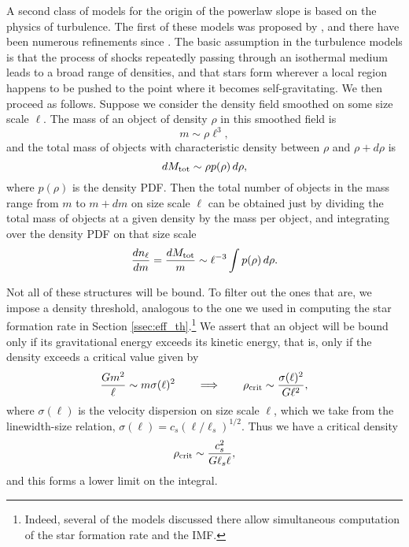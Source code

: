 A second class of models for the origin of the powerlaw slope is based on the physics of turbulence. The first of these models was proposed by \citet{padoan97a}, and there have been numerous refinements since \citep[e.g.,][]{padoan02a, padoan07a, hennebelle08b, hennebelle09a, hopkins12e, hopkins12d}. The basic assumption in the turbulence models is that the process of shocks repeatedly passing through an isothermal medium leads to a broad range of densities, and that stars form wherever a local region happens to be pushed to the point where it becomes self-gravitating. We then proceed as follows. Suppose we consider the density field smoothed on some size scale $\ell$. The mass of an object of density $\rho$ in this smoothed field is
\begin{equation}
m \sim \rho \ell^3,
\end{equation}
and the total mass of objects with characteristic density between $\rho$ and $\rho+d\rho$ is
\begin{equation}
dM_{\rm tot} \sim \rho p(\rho) \,d\rho,
\end{equation}
where $p(\rho)$ is the density PDF. Then the total number of objects in the mass range from $m$ to $m+dm$ on size scale $\ell$ can be obtained just by dividing the total mass of objects at a given density by the mass per object, and integrating over the density PDF on that size scale
\begin{equation}
\frac{dn_\ell}{dm} = \frac{dM_{\rm tot}}{m} \sim  \ell^{-3} \int p(\rho) \,d\rho.
\end{equation}

Not all of these structures will be bound. To filter out the ones that are, we impose a density threshold, analogous to the one we used in computing the star formation rate in Section \ref{ssec:eff_th}.\footnote{Indeed, several of the models discussed there allow simultaneous computation of the star formation rate and the IMF.} We assert that an object will be bound only if its gravitational energy exceeds its kinetic energy, that is, only if the density exceeds a critical value given by
\begin{equation}
\frac{Gm^2}{\ell} \sim m \sigma(\ell)^2
\qquad\Longrightarrow\qquad
\rho_{\rm crit} \sim \frac{\sigma(\ell)^2}{G \ell^2},
\end{equation}
where $\sigma(\ell)$ is the velocity dispersion on size scale $\ell$, which we take from the linewidth-size relation, $\sigma(\ell) = c_s (\ell/\ell_s)^{1/2}$. Thus we have a critical density
\begin{equation}
\rho_{\rm crit} \sim \frac{c_s^2}{G \ell_s \ell},
\end{equation}
and this forms a lower limit on the integral.

